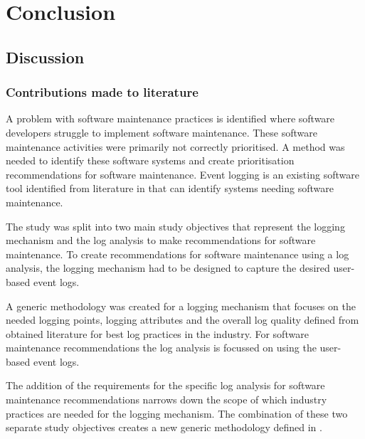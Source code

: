 \chapter{Conclusion}
\label{chap:4}

\section{Discussion}

\subsection{Contributions made to literature}
A problem with software maintenance practices is identified where software developers struggle to
implement software maintenance. These software maintenance activities were primarily not correctly
prioritised. A method was needed to identify these software systems and create prioritisation
recommendations for software maintenance. Event logging is an existing software tool 
identified from literature in  that can identify systems needing software
maintenance. \par The study was split into two main study objectives that represent the logging
mechanism and the log analysis to make recommendations for software maintenance. To create
recommendations for software maintenance using a log analysis, the logging mechanism had to be
designed to capture the desired user-based event logs. \par A generic methodology was created for a
logging mechanism that focuses on the needed logging points, logging attributes and the overall log
quality defined from obtained literature for best log practices in the industry. For software
maintenance recommendations the log analysis is focussed on using the user-based event logs.\par The
addition of the requirements for the specific log analysis for software maintenance recommendations
narrows down the scope of which industry practices are needed for the logging mechanism. The
combination of these two separate study objectives creates a new generic methodology defined in
.

